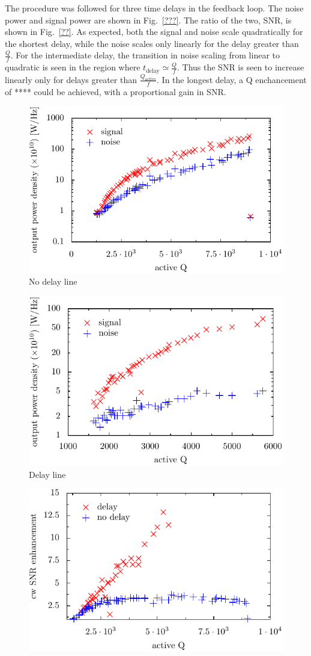 \documentclass[aps,prl,twocolumn,groupedaddress]{revtex4-1}
\begin{document}
The procedure was followed for three time delays in the feedback loop.  
The noise power and signal power are shown in Fig.~\ref{???}.
The ratio of the two, SNR, is shown in Fig.~\ref{??}.
As expected, both the signal and noise scale quadratically for the shortest delay, while the noise scales only linearly for the delay greater than $\frac{Q}{f}$.
For the intermediate delay, the transition in noise scaling from linear to quadratic is seen in the region where $t_{\mathrm{delay}}\simeq\frac{Q}{f}$. 
Thus the SNR is seen to increase linearly only for delays greater than $\frac{Q_{\mathrm{active}}}{f}$.
In the longest delay, a Q enchancement of **** could be achieved, with a proportional gain in SNR.

\begin{figure}[htbp]
\includegraphics[width=.5\textwidth]{figs/measurement_6}
\caption{No delay line}
\label{fig:measurement_6}
\end{figure}

\begin{figure}[htbp]
\includegraphics[width=.5\textwidth]{figs/measurement_7}
\caption{Delay line}
\label{fig:measurement_7}
\end{figure}

\begin{figure}[htbp]
\includegraphics[width=.5\textwidth]{figs/experiment}
\caption{}
\label{fig:summary_plots}
\end{figure}
\end{document}
